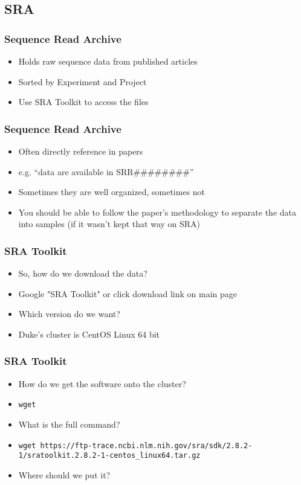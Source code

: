 \documentclass[14pt]{beamer}
\begin{document}
\subsection{SRA}

\begin{frame}
\frametitle{Sequence Read Archive}
\begin{itemize}
	\item<+-> Holds raw sequence data from published articles
	\item<+-> Sorted by Experiment and Project
	\item<+-> Use SRA Toolkit to access the files
\end{itemize}
\end{frame}

\begin{frame}
\frametitle{Sequence Read Archive}
\begin{itemize}
	\item<+-> Often directly reference in papers
	\item<+-> e.g. ``data are available in SRR\#\#\#\#\#\#\#\#''
	\item<+-> Sometimes they are well organized, sometimes not
	\item<+-> You should be able to follow the paper's methodology to separate the data into samples (if it wasn't kept that way on SRA)
\end{itemize}
\end{frame}

\begin{frame}
\frametitle{SRA Toolkit}
\begin{itemize}
	\item<+-> So, how do we download the data?
	\item<+-> Google "SRA Toolkit" or click download link on main page
	\item<+-> Which version do we want?
	\item<+-> Duke's cluster is CentOS Linux 64 bit
\end{itemize}
\end{frame}

\begin{frame}
\frametitle{SRA Toolkit}
\begin{itemize}
	\item<+-> How do we get the software onto the cluster?
	\item<+-> \texttt{wget}
	\item<+-> What is the full command?
	\item<+-> \texttt{wget https://ftp-trace.ncbi.nlm.nih.gov/sra/sdk/2.8.2-1/sratoolkit.2.8.2-1-centos\_linux64.tar.gz}
	\item<+-> Where should we put it? 
\end{itemize}
\end{frame}
\end{document}

